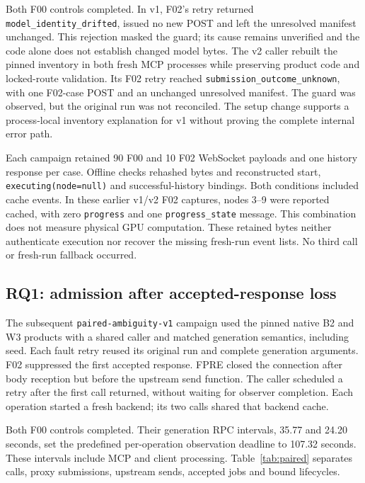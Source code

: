 \documentclass{ieeeaccess}
\begin{document}
Both F00 controls completed. In v1, F02's retry returned
\texttt{model\_identity\_drifted}, issued no new POST and left the unresolved
manifest unchanged. This rejection masked the guard; its cause remains
unverified and the code alone does not establish changed model bytes.
The v2 caller rebuilt the pinned inventory in both fresh MCP processes while
preserving product code and locked-route validation. Its F02 retry reached
\texttt{submission\_outcome\_unknown}, with one F02-case POST and an unchanged
unresolved manifest. The guard was observed, but the original run was not
reconciled. The setup change supports a process-local inventory explanation
for v1 without proving the complete internal error path.

Each campaign retained 90 F00 and 10 F02 WebSocket payloads and one history
response per case. Offline checks rehashed bytes and reconstructed start,
\texttt{executing(node=null)} and successful-history bindings. Both conditions
included cache events. In these earlier v1/v2 F02 captures, nodes 3--9 were
reported cached, with zero \texttt{progress} and one \texttt{progress\_state}
message. This combination does not measure physical GPU computation.
These retained bytes neither authenticate execution nor recover
the missing fresh-run event lists. No third call or fresh-run fallback occurred.

\subsection{RQ1: admission after accepted-response loss}
\label{sec:paired}

The subsequent \texttt{paired-ambiguity-v1} campaign used the pinned native B2
and W3 products with a shared caller and matched generation semantics, including
seed. Each fault retry reused its original run and complete generation arguments.
F02 suppressed the first accepted response. FPRE closed the connection after
body reception but before the upstream send function. The caller scheduled a
retry after the first call returned, without waiting for observer completion.
Each operation started a fresh backend; its two calls shared that backend cache.

Both F00 controls completed. Their generation RPC intervals, 35.77 and 24.20
seconds, set the predefined per-operation observation deadline to 107.32
seconds. These intervals
include MCP and client processing. Table~\ref{tab:paired} separates calls,
proxy submissions, upstream sends, accepted jobs and bound lifecycles.
\end{document}
